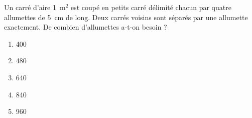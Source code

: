 Un carré d'aire 1~m$^2$ est coupé en petits carré délimité chacun par
quatre allumettes de 5~cm de long. Deux carrés voisins sont séparés
par une allumette exactement. De combien d'allumettes a-t-on besoin ?
\begin{multicols}{5}
  \begin{enumerate}[A/]
  \item 400
  \item 480
  \item 640
  \item 840
  \item 960
  \end{enumerate}
\end{multicols}